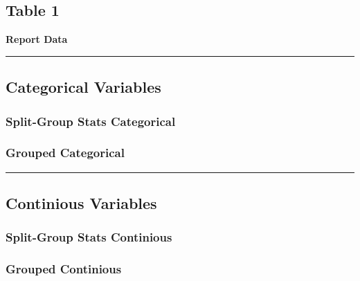 \documentclass[]{article}
\begin{document}
\hypertarget{table-1}{%
\subsection{Table 1}\label{table-1}}

\textbf{Report Data}

\begin{center}\rule{0.5\linewidth}{\linethickness}\end{center}

\hypertarget{categorical-variables}{%
\subsection{Categorical Variables}\label{categorical-variables}}

\hypertarget{split-group-stats-categorical}{%
\subsubsection{Split-Group Stats
Categorical}\label{split-group-stats-categorical}}

\hypertarget{grouped-categorical}{%
\subsubsection{Grouped Categorical}\label{grouped-categorical}}

\pagebreak

\begin{center}\rule{0.5\linewidth}{\linethickness}\end{center}

\hypertarget{continious-variables}{%
\subsection{Continious Variables}\label{continious-variables}}

\hypertarget{split-group-stats-continious}{%
\subsubsection{Split-Group Stats
Continious}\label{split-group-stats-continious}}

\hypertarget{grouped-continious}{%
\subsubsection{Grouped Continious}\label{grouped-continious}}
\end{document}
